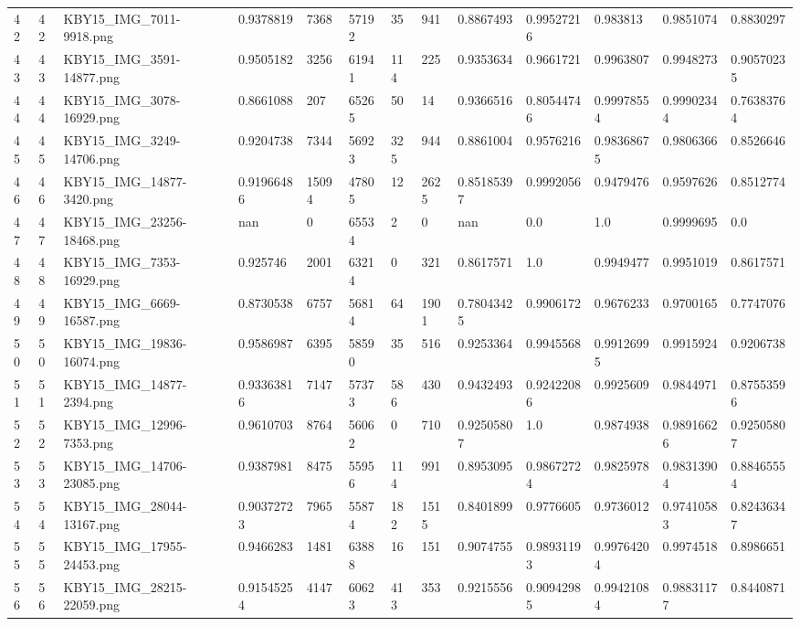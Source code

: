 \documentclass[11pt, a4paper, twoside]{report}
\begin{document}
\begin{longtable}[c]{@{}lllllllllllll@{}}
42 & 42 & KBY15\_IMG\_7011-9918.png & 0.9378819 & 7368 & 57192 & 35 & 941 & 0.8867493 & 0.99527216 & 0.983813 & 0.9851074 & 0.8830297 \\
43 & 43 & KBY15\_IMG\_3591-14877.png & 0.9505182 & 3256 & 61941 & 114 & 225 & 0.9353634 & 0.9661721 & 0.9963807 & 0.9948273 & 0.90570235 \\
44 & 44 & KBY15\_IMG\_3078-16929.png & 0.8661088 & 207 & 65265 & 50 & 14 & 0.9366516 & 0.80544746 & 0.99978554 & 0.99902344 & 0.76383764 \\
45 & 45 & KBY15\_IMG\_3249-14706.png & 0.9204738 & 7344 & 56923 & 325 & 944 & 0.8861004 & 0.9576216 & 0.98368675 & 0.9806366 & 0.8526646 \\
46 & 46 & KBY15\_IMG\_14877-3420.png & 0.91966486 & 15094 & 47805 & 12 & 2625 & 0.85185397 & 0.9992056 & 0.9479476 & 0.9597626 & 0.8512774 \\
47 & 47 & KBY15\_IMG\_23256-18468.png & nan & 0 & 65534 & 2 & 0 & nan & 0.0 & 1.0 & 0.9999695 & 0.0 \\
48 & 48 & KBY15\_IMG\_7353-16929.png & 0.925746 & 2001 & 63214 & 0 & 321 & 0.8617571 & 1.0 & 0.9949477 & 0.9951019 & 0.8617571 \\
49 & 49 & KBY15\_IMG\_6669-16587.png & 0.8730538 & 6757 & 56814 & 64 & 1901 & 0.78043425 & 0.9906172 & 0.9676233 & 0.9700165 & 0.7747076 \\
50 & 50 & KBY15\_IMG\_19836-16074.png & 0.9586987 & 6395 & 58590 & 35 & 516 & 0.9253364 & 0.9945568 & 0.99126995 & 0.9915924 & 0.9206738 \\
51 & 51 & KBY15\_IMG\_14877-2394.png & 0.93363816 & 7147 & 57373 & 586 & 430 & 0.9432493 & 0.92422086 & 0.9925609 & 0.9844971 & 0.87553596 \\
52 & 52 & KBY15\_IMG\_12996-7353.png & 0.9610703 & 8764 & 56062 & 0 & 710 & 0.92505807 & 1.0 & 0.9874938 & 0.98916626 & 0.92505807 \\
53 & 53 & KBY15\_IMG\_14706-23085.png & 0.9387981 & 8475 & 55956 & 114 & 991 & 0.8953095 & 0.98672724 & 0.9825978 & 0.98313904 & 0.88465554 \\
54 & 54 & KBY15\_IMG\_28044-13167.png & 0.90372723 & 7965 & 55874 & 182 & 1515 & 0.8401899 & 0.9776605 & 0.9736012 & 0.97410583 & 0.82436347 \\
55 & 55 & KBY15\_IMG\_17955-24453.png & 0.9466283 & 1481 & 63888 & 16 & 151 & 0.9074755 & 0.98931193 & 0.99764204 & 0.9974518 & 0.8986651 \\
56 & 56 & KBY15\_IMG\_28215-22059.png & 0.91545254 & 4147 & 60623 & 413 & 353 & 0.9215556 & 0.90942985 & 0.99421084 & 0.98831177 & 0.8440871 \\

\end{longtable}
\end{document}
